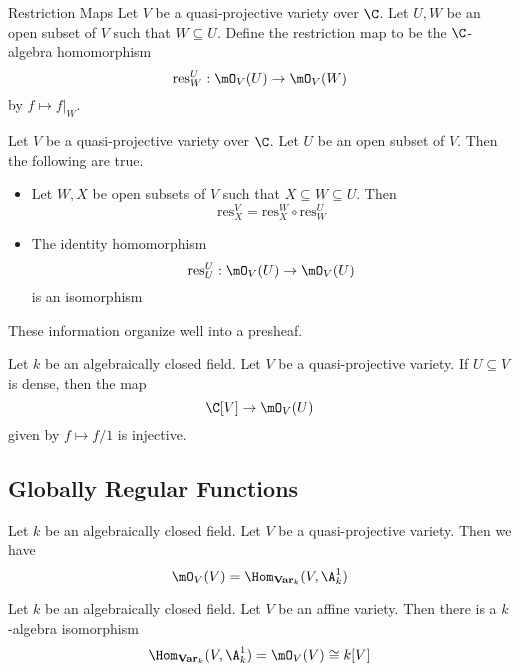 \documentclass[a4paper]{article}
\begin{document}
\begin{defn}{Restriction Maps}{} Let $V$ be a quasi-projective variety over $\C$. Let $U,W$ be an open subset of $V$ such that $W\subseteq U$. Define the restriction map to be the $\C$-algebra homomorphism $$\text{res}_W^U:\mO_V(U)\to\mO_V(W)$$ by $f\mapsto f|_W$. 
\end{defn}

\begin{prp}{}{} Let $V$ be a quasi-projective variety over $\C$. Let $U$ be an open subset of $V$. Then the following are true. 
\begin{itemize}
\item Let $W,X$ be open subsets of $V$ such that $X\subseteq W\subseteq U$. Then $$\text{res}_X^V=\text{res}_X^W\circ\text{res}_W^U$$
\item The identity homomorphism $$\text{res}_U^U:\mO_V(U)\to\mO_V(U)$$ is an isomorphism
\end{itemize}
\end{prp}

These information organize well into a presheaf. 

\begin{lmm}{}{} Let $k$ be an algebraically closed field. Let $V$ be a quasi-projective variety. If $U\subseteq V$ is dense, then the map $$\C[V]\to\mO_V(U)$$ given by $f\mapsto f/1$ is injective. 
\end{lmm}

\subsection{Globally Regular Functions}
\begin{prp}{}{} Let $k$ be an algebraically closed field. Let $V$ be a quasi-projective variety. Then we have $$\mO_V(V)=\Hom_{\bold{Var}_k}(V,\A_k^1)$$
\end{prp}

\begin{prp}{}{} Let $k$ be an algebraically closed field. Let $V$ be an affine variety. Then there is a $k$-algebra isomorphism $$\Hom_{\bold{Var}_k}(V,\A_k^1)=\mO_V(V)\cong k[V]$$
\end{prp}
\end{document}
